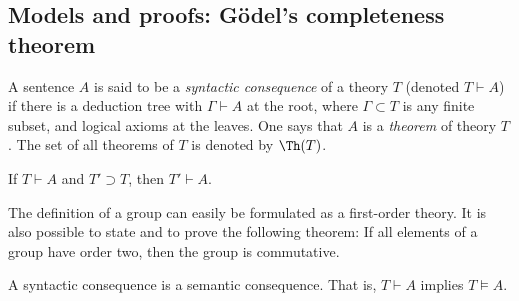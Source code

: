 \begin{page}
\setcounter{section}{3}
\setcounter{subsection}{2}
\setcounter{dfn}{13}
\label{portion:616}

\subsection{Models and proofs: G\"odel's completeness theorem}

\end{page}

\begin{page}
\setcounter{section}{3}
\setcounter{subsection}{2}
\setcounter{dfn}{14}
\label{portion:618}

\begin{dfn}
A sentence $A$ is said to be a \emph{syntactic consequence} of a theory $T$ (denoted $T \vdash A$) if
there is a deduction tree with $\Gamma \vdash A$ at the root, where $\Gamma \subset T$ is any finite subset, and logical axioms at the leaves.
One says that $A$ is a \emph{theorem} of theory $T$.
The set of all theorems of $T$ is denoted by $\Th(T)$.
\end{dfn}

\end{page}

\begin{page}
\setcounter{section}{3}
\setcounter{subsection}{2}
\setcounter{dfn}{15}
\label{portion:621}

\begin{exc}
If $T \vdash A$ and $T' \supset T$, then $T' \vdash A$.
\end{exc}

\end{page}

\begin{page}
\setcounter{section}{3}
\setcounter{subsection}{2}
\setcounter{dfn}{16}
\label{portion:624}

\begin{exl}
The definition of a group can easily be formulated as a first-order theory.
It is also possible to state and to prove the following theorem:
If all elements of a group have order two, then the group is commutative.
\end{exl}

\end{page}

\begin{page}
\setcounter{section}{3}
\setcounter{subsection}{2}
\setcounter{dfn}{17}
\label{portion:627}

\begin{lem}
A syntactic consequence is a semantic consequence.
That is, $T \vdash A$ implies $T \vDash A$.
\end{lem}

\end{page}

